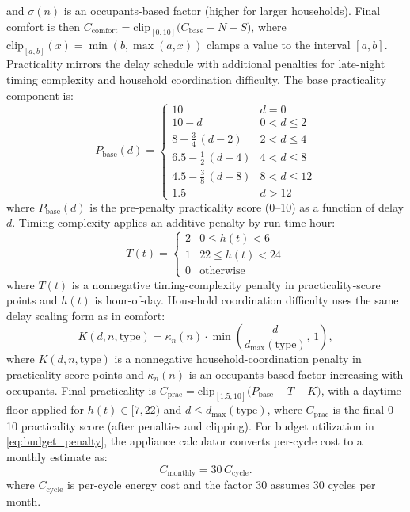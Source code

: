 \documentclass[final,3p,times]{elsarticle}
\begin{document}
and $\sigma(n)$ is an occupants-based factor (higher for larger households).
Final comfort is then $C_{\mathrm{comfort}}=\mathrm{clip}_{[0,10]}\!\bigl(C_{\mathrm{base}}-N-S\bigr)$,
where $\mathrm{clip}_{[a,b]}(x)=\min(b,\max(a,x))$ clamps a value to the interval $[a,b]$.
Practicality mirrors the delay schedule with additional penalties for
late-night timing complexity and household coordination difficulty.
The base practicality component is:
\begin{equation}
  P_{\mathrm{base}}(d)=
  \begin{cases}
    10                                  & d=0 \\[3pt]
    10-d                                & 0<d\le 2 \\[3pt]
    8-\frac{3}{4}\,(d-2)                & 2<d\le 4 \\[3pt]
    6.5-\frac{1}{2}\,(d-4)              & 4<d\le 8 \\[3pt]
    4.5-\frac{3}{8}\,(d-8)              & 8<d\le 12 \\[3pt]
    1.5                                 & d>12
  \end{cases}
  \label{eq:appliance_base_practicality}
\end{equation}
\noindent where $P_{\mathrm{base}}(d)$ is the pre-penalty practicality score (0--10) as a function of delay $d$.
Timing complexity applies an additive penalty by run-time hour:
\begin{equation}
  T(t)=
  \begin{cases}
    2 & 0\le h(t)<6 \\[3pt]
    1 & 22\le h(t)<24 \\[3pt]
    0 & \text{otherwise}
  \end{cases}
  \label{eq:appliance_timing_penalty}
\end{equation}
\noindent where $T(t)$ is a nonnegative timing-complexity penalty in practicality-score points and $h(t)$ is hour-of-day.
Household coordination difficulty uses the same delay scaling form as in comfort:
\begin{equation}
  K(d,n,\mathrm{type})=\kappa_n(n)\cdot \min\!\left(\frac{d}{d_{\max}(\mathrm{type})},\,1\right),
  \label{eq:appliance_coordination_penalty}
\end{equation}
\noindent where $K(d,n,\mathrm{type})$ is a nonnegative household-coordination penalty in practicality-score points
and $\kappa_n(n)$ is an occupants-based factor increasing with occupants.
Final practicality is $C_{\mathrm{prac}}=\mathrm{clip}_{[1.5,10]}\!\bigl(P_{\mathrm{base}}-T-K\bigr)$,
with a daytime floor applied for $h(t)\in[7,22)$ and $d\le d_{\max}(\mathrm{type})$, where
$C_{\mathrm{prac}}$ is the final 0--10 practicality score (after penalties and clipping).
For budget utilization in \eqref{eq:budget_penalty}, the appliance calculator converts per-cycle
cost to a monthly estimate as:
\begin{equation}
  C_{\mathrm{monthly}} = 30\,C_{\mathrm{cycle}}.
  \label{eq:appliance_monthly_cost}
\end{equation}
\noindent where $C_{\mathrm{cycle}}$ is per-cycle energy cost and the factor $30$ assumes 30 cycles per month.
\end{document}
